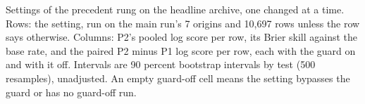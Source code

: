 \begin{table}[t]\centering\scriptsize
\caption{Settings of the precedent rung on the headline archive, one changed at a time. Rows: the setting, run on the main run's 7 origins and 10,697 rows unless the row says otherwise. Columns: P2's pooled log score per row, its Brier skill against the base rate, and the paired P2 minus P1 log score per row, each with the guard on and with it off. Intervals are 90 percent bootstrap intervals by test (500 resamples), unadjusted. An empty guard-off cell means the setting bypasses the guard or has no guard-off run.}
\label{tab:fmt-p2-settings}
\resizebox{\textwidth}{!}{}
\end{table}

